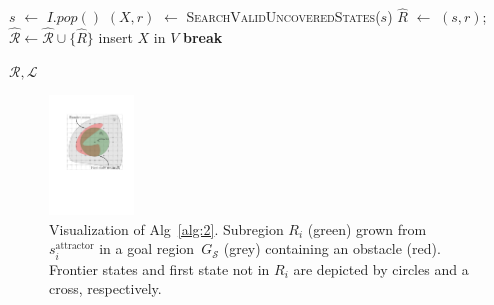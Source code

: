 \documentclass[letterpaper]{article} %
\newcommand{\calL}{\ensuremath{\mathcal{L}}\xspace}
\newcommand{\calS}{\ensuremath{\mathcal{S}}\xspace}
\newcommand{\calR}{\ensuremath{\mathcal{R}}\xspace}
\newcommand{\sAttract}{\ensuremath{s^{\text{attractor}}_i}\xspace}
\begin{document}
\begin{algorithm}[t]
\begin{algorithmic}[1]
\vspace{2mm}        
        
         \label{alg:1:iv_loop}
            \State $s$ $\leftarrow$ $I.pop()$
			\If {$\nexists R \in \calR \cup \hat{\calR}$ s.t. $s \in R$ }      
\State $(X, r)$ $\leftarrow$ \textsc{SearchValidUncoveredStates}($s$)
                \State $\hat{R}$ $\leftarrow$ $(s,r)$;
				\hspace{2mm}
				$\hat{\calR} \leftarrow \hat{\calR} \cup \{ \hat{R} \}$   \label{alg:1:iv_region}
                    \label{alg:1:x_states}
                    \State insert $X$ in $V$
                    \State \textbf{break} \label{alg:1:break}
                \EndIf
            \EndIf
        \EndWhile
    \EndWhile

  \vspace{2mm}

  \State \Return $\calR, \calL$
\EndProcedure
\end{algorithmic}
\end{algorithm}

\begin{figure}[tb]
  \centering
  	\includegraphics[width=0.20\textwidth]{Alg2.pdf}
  \caption{
  Visualization of Alg~\ref{alg:2}. Subregion $R_i$ (green) grown from $\sAttract$ in a goal region~$G_\calS$ (grey) containing an obstacle (red).
  Frontier states  and first state not in $R_i$ are depicted by circles and a cross, respectively.
}
   	\label{fig:alg2}
 \vspace{-6mm}
\end{figure}


\end{document}
